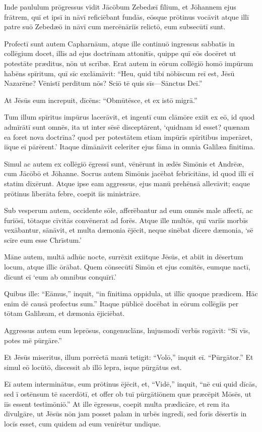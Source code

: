 \Versus Inde paululum prōgressus vīdit Jācōbum Zebedæī fīlium, et Jōhannem ejus frātrem, quī et ipsī in nāvī reficiēbant fundās,
\Versus eōsque prōtinus vocāvit atque illī patre suō Zebedæō in nāvī cum mercēnāriīs relictō, eum subsecūtī sunt.

\Versus Profectī sunt autem Capharnāum, atque ille continuō ingressus sabbatīs in collēgium docet,
\Versus illīs ad ejus doctrīnam attonitīs, quippe quī eōs docēret ut potestāte præditus, nōn ut scrībæ.
\Versus Erat autem in eōrum collēgiō homō impūrum habēns spīritum, quī sīc exclāmāvit:
\Versus ``Heu, quid tibi nōbīscum reī est, Jēsū Nazarēne? Vēnistī perditum nōs? Sciō tē quis sīs—Sānctus Deī.''

\Versus At Jēsūs eum increpuit, dīcēns: ``Obmūtēsce, et ex istō migrā.''

\Versus Tum illum spīritus impūrus lacerāvit, et ingentī cum clāmōre exiit ex eō,
\Versus id quod admīrātī sunt omnēs, ita ut inter sēsē disceptārent, `quidnam id esset? quænam ea foret nova doctrīna? quod per potestātem etiam impūrīs spīritibus imperāret, iīque eī pārērent.'
\Versus Itaque dīmānāvit celeriter ejus fāma in omnia Galilæa fīnitima.

\Versus Simul ac autem ex collēgiō ēgressī sunt, vēnērunt in ædēs Simōnis et Andrēæ, cum Jācōbō et Jōhanne.
\Versus Socrus autem Simōnis jacēbat febrīcitāns, id quod illī eī statim dīxērunt.
\Versus Atque ipse eam aggressus, ejus manū prehēnsā allevāvit; eaque prōtinus līberāta febre, coepit iīs ministrāre.

\Versus Sub vesperum autem, occidente sōle, afferēbantur ad eum omnēs male affectī, ac furiōsī,
\Versus tōtaque cīvitās convēnerat ad forēs.
\Versus Atque ille multōs, quī variīs morbīs vexābantur, sānāvit, et multa dæmonia ējēcit, neque sinēbat dīcere dæmonia, `sē scīre eum esse Chrīstum.'

\Versus Māne autem, multā adhūc nocte, surrēxit exiitque Jēsūs, et abiit in dēsertum locum, atque illīc ōrābat.
\Versus Quem cōnsecūtī Simōn et ejus comitēs,
\Versus eumque nactī, dīcunt eī `eum ab omnibus conquīrī.'

\Versus Quibus ille: ``Eāmus,'' inquit, ``in fīnitima oppidula, ut illīc quoque prædicem. Hāc enim dē causā profectus sum.''
\Versus Itaque pūblicē docēbat in eōrum collēgiīs per tōtam Galilæam, et dæmonia ējiciēbat.

\Versus Aggressus autem eum leprōsus, congenuclāns, hujusmodī verbīs rogāvit: ``Sī vīs, potes mē pūrgāre.''

\Versus Et Jēsūs miseritus, illum porrēctā manū tetigit: ``Volō,'' inquit eī. ``Pūrgātor.''
\Versus Et simul eō locūtō, discessit ab illō lepra, isque pūrgātus est.

\Versus Eī autem interminātus, eum prōtinus ējēcit,
\Versus et, ``Vidē,'' inquit, ``nē cui quid dīcās, sed ī ostēnsum tē sacerdōtī, et offer ob tuī pūrgātiōnem quæ præcēpit Mōsēs, ut iīs essent testimōniō.''
\Versus At ille ēgressus, coepit multa prædicāre, et rem ita dīvulgāre, ut Jēsūs nōn jam posset palam in urbēs ingredī, sed forīs dēsertīs in locīs esset, cum quidem ad eum venīrētur undique.
